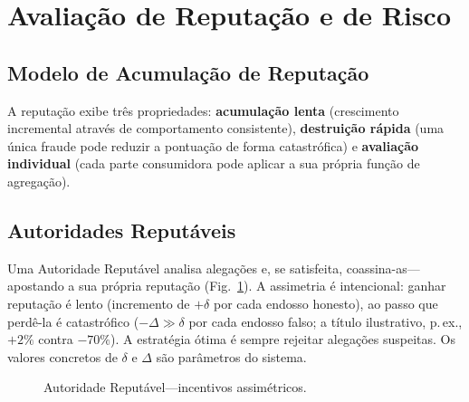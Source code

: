 \documentclass[11pt,a4paper,twocolumn]{article}
\begin{document}
\section{Avaliação de Reputação e de Risco}

\subsection{Modelo de Acumulação de Reputação}

A reputação exibe três propriedades: \textbf{acumulação lenta} (crescimento incremental através de comportamento consistente), \textbf{destruição rápida} (uma única fraude pode reduzir a pontuação de forma catastrófica) e \textbf{avaliação individual} (cada parte consumidora pode aplicar a sua própria função de agregação).

\subsection{Autoridades Reputáveis}

Uma Autoridade Reputável analisa alegações e, se satisfeita, coassina-as---apostando a sua própria reputação (Fig.~\ref{fig:authority}). A assimetria é intencional: ganhar reputação é lento (incremento de $+\delta$ por cada endosso honesto), ao passo que perdê-la é catastrófico ($-\Delta \gg \delta$ por cada endosso falso; a título ilustrativo, p.\,ex., $+2\%$ contra $-70\%$). A estratégia ótima é sempre rejeitar alegações suspeitas. Os valores concretos de $\delta$ e $\Delta$ são parâmetros do sistema.

\begin{figure}[ht]
\centering
{}
\caption{Autoridade Reputável---incentivos assimétricos.}
\label{fig:authority}
\end{figure}
\end{document}
